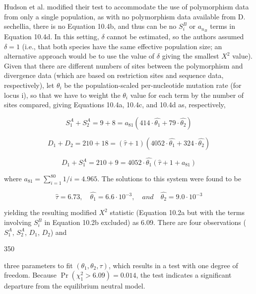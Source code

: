 \documentclass{article}
\begin{document}
Hudson et al. modified their test to accommodate the use of polymorphism data from only a single population, as with no polymorphism data available from D. sechellia, there is no Equation 10.4b, and thus can be no  $ S_i^B $ or  $ a_{n_B} $ terms in Equation 10.4d. In this setting,  $ \delta $ cannot be estimated, so the authors assumed  $ \delta = 1 $ (i.e., that both species have the same effective population size; an alternative approach would be to use the value of  $ \delta $ giving the smallest  $ X^2 $ value). Given that there are different numbers of sites between the polymorphism and divergence data (which are based on restriction sites and sequence data, respectively), let  $ \theta_i $ be the population-scaled per-nucleotide mutation rate (for locus i), so that we have to weight the  $ \theta_i $ value for each term by the number of sites compared, giving Equations 10.4a, 10.4c, and 10.4d as, respectively,

\begin{equation}
S_{1}^{A}+S_{2}^{A}=9+8=a_{81}(414\cdot\widehat{\theta_{1}}+79\cdot\widehat{\theta_{2}})
\end{equation}

\begin{equation}
D_{1}+D_{2}=210+18=\left(\widehat{\tau}+1\right)\left(4052\cdot\widehat{\theta_{1}}+324\cdot\widehat{\theta_{2}}\right)
\end{equation}

\begin{equation}
D_{1}+S_{1}^{A}=210+9=4052\cdot\widehat{\theta_{1}}\left(\widehat{\tau}+1+a_{81}\right)
\end{equation}

where  $ a_{81} = \sum_{i=1}^{80} 1/i = 4.965 $. The solutions to this system were found to be

\begin{equation}
\widehat{\tau}=6.73,\quad\widehat{\theta_{1}}=6.6\cdot10^{-3},\quad and\quad\widehat{\theta_{2}}=9.0\cdot10^{-3}
\end{equation}

yielding the resulting modified  $ X^{2} $ statistic (Equation 10.2a but with the terms involving  $ S_{i}^{B} $ in Equation 10.2b excluded) as 6.09. There are four observations ( $ S_{1}^{A} $,  $ S_{2}^{A} $,  $ D_{1} $,  $ D_{2} $) and

350

three parameters to fit $(\theta_1, \theta_2, \tau)$, which results in a test with one degree of freedom. Because $\Pr(\chi_1^2 > 6.09) = 0.014$, the test indicates a significant departure from the equilibrium neutral model.
\end{document}
